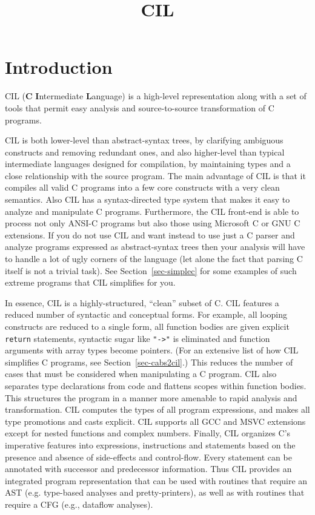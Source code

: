 \documentclass{article}
\title{CIL}
\def\secref#1{Section~\ref{sec-#1}}
\begin{document}
\maketitle

\section{Introduction}

 CIL ({\bf C} {\bf I}ntermediate {\bf L}anguage) is a high-level representation
along with a set of tools that permit easy analysis and source-to-source
transformation of C programs.

 CIL is both lower-level than abstract-syntax trees, by clarifying ambiguous
constructs and removing redundant ones, and also higher-level than typical
intermediate languages designed for compilation, by maintaining types and a
close relationship with the source program. The main advantage of CIL is that
it compiles all valid C programs into a few core constructs with a very clean
semantics. Also CIL has a syntax-directed type system that makes it easy to
analyze and manipulate C programs. Furthermore, the CIL front-end is able to
process not only ANSI-C programs but also those using Microsoft C or GNU C
extensions. If you do not use CIL and want instead to use just a C parser and
analyze programs expressed as abstract-syntax trees then your analysis will
have to handle a lot of ugly corners of the language (let alone the fact that
parsing C itself is not a trivial task). See \secref{simplec} for some
examples of such extreme programs that CIL simplifies for you.

 In essence, CIL is a highly-structured, ``clean'' subset of C. CIL features a
reduced number of syntactic and conceptual forms. For example, all looping
constructs are reduced to a single form, all function bodies are given
explicit {\tt return} statements, syntactic sugar like {\tt "->"} is
eliminated and function arguments with array types become pointers. (For an
extensive list of how CIL simplifies C programs, see \secref{cabs2cil}.)
This reduces the number of cases that must be considered when manipulating a C
program. CIL also separates type declarations from code and flattens scopes
within function bodies. This structures the program in a manner more amenable
to rapid analysis and transformation. CIL computes the types of all program
expressions, and makes all type promotions and casts explicit. CIL supports
all GCC and MSVC extensions except for nested functions and complex numbers.
Finally, CIL organizes C's imperative features into expressions, instructions
and statements based on the presence and absence of side-effects and
control-flow. Every statement can be annotated with successor and predecessor
information. Thus CIL provides an integrated program representation that can
be used with routines that require an AST (e.g. type-based analyses and
pretty-printers), as well as with routines that require a CFG (e.g., dataflow
analyses).
\end{document}
